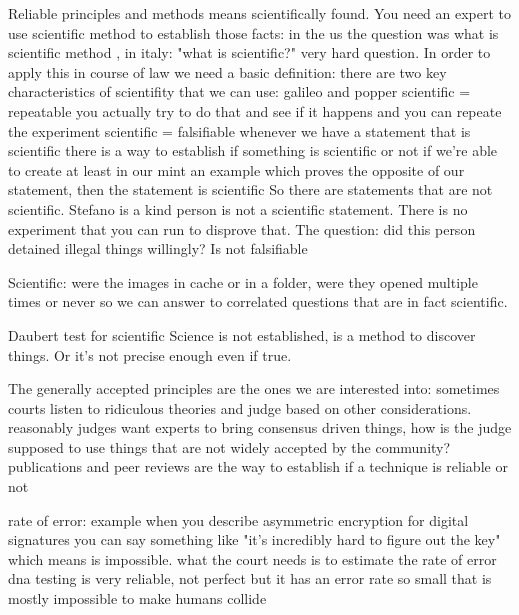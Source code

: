         Reliable principles and methods means scientifically found.
        You need an expert to use scientific method to establish those facts:
        in the us the question was what is scientific method ,
        in italy: "what is scientific?"
            very hard question.
            In order to apply this in course of law we need a basic definition:
            there are two key characteristics of scientifity that we can use:
                galileo and popper 
                scientific = repeatable
                    you actually try to do that and see if it happens
                    and you can repeate the experiment
                scientific = falsifiable
                    whenever we have a statement that is scientific 
                    there is a way to establish if something is scientific or not
                    if we're able to create at least in our mint an example which proves the opposite of our statement, then the statement is scientific 
                    So there are statements that are not scientific. Stefano is a kind person is not a scientific statement. There is no experiment that you can run to disprove that.
                    The question: did this person detained illegal things willingly? Is not falsifiable 

                    Scientific: were the images in cache or in a folder, were they opened multiple times or never
                    so we can answer to correlated questions that are in fact scientific.

        Daubert test for scientific
            Science is not established, is a method to discover things. 
            Or it's not precise enough even if true.

            The generally accepted principles are the ones we are interested into:
                sometimes courts listen to ridiculous theories and judge based on other considerations.
                reasonably judges want experts to bring consensus driven things, how is the judge supposed to use things that are not widely accepted by the community?
                publications and peer reviews are the way to establish if a technique is reliable or not

            rate of error: example when you describe asymmetric encryption for digital signatures
                you can say something like "it's incredibly hard to figure out the key" which means is impossible.
                what the court needs is to estimate the rate of error
                dna testing is very reliable, not perfect but it has an error rate so small that is mostly impossible to make humans collide

